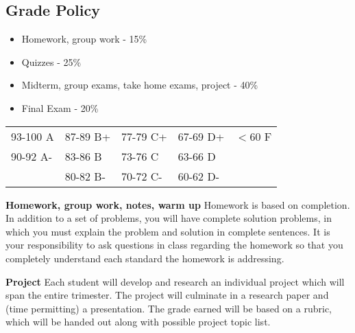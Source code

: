 \documentclass[12pt]{article}
\begin{document}
%
%
%
%
%
%
%


\subsection*{Grade Policy}
\begin{itemize}
\item Homework, group work - 15\%
\item Quizzes - 25\%
\item Midterm, group exams, take home exams,  project - 40\%
\item Final Exam - 20\%
\end{itemize}


\begin{table}[h!]
\begin{tabular}{lllll}
\hline
93-100 A & 87-89 B+ & 77-79 C+ & 67-69 D+ & $<60$ F \\
90-92 A- & 83-86 B & 73-76 C & 63-66 D & \\
 & 80-82 B- & 70-72 C- & 60-62 D- & \\ \hline
\end{tabular}
\end{table}



\textbf{Homework, group work, notes, warm up}  Homework is based on completion.  In addition to a set of problems, you will have complete solution problems, in which you must explain the problem and solution in complete sentences.  It is your responsibility to ask questions in class regarding the homework so that you completely understand each standard the homework is addressing.

\textbf{Project}  Each student will develop and research an individual project which will span the entire trimester.  The project will culminate in a research paper and (time permitting) a presentation.  The grade earned will be based on a rubric, which will be handed out along with possible project topic list.
\end{document}
